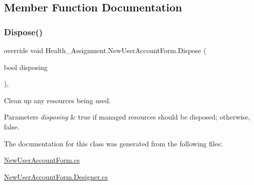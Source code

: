 \subsection{Member Function Documentation}
\mbox{\label{class_health___assignment_1_1_new_user_account_form_a0e75f26c896eb8b06255a75fb8007bb5}} 
\subsubsection{\texorpdfstring{Dispose()}{Dispose()}}
{\footnotesize\ttfamily override void Health\+\_\+\+Assignment.\+New\+User\+Account\+Form.\+Dispose (\begin{DoxyParamCaption}\item[{bool}]{disposing }\end{DoxyParamCaption})\hspace{0.3cm}{\ttfamily [inline]}, {\ttfamily [protected]}}



Clean up any resources being used. 


\begin{DoxyParams}{Parameters}
{\em disposing} & true if managed resources should be disposed; otherwise, false.\\
\hline
\end{DoxyParams}


The documentation for this class was generated from the following files\+:\begin{DoxyCompactItemize}
\item 
\hyperlink{_new_user_account_form_8cs}{New\+User\+Account\+Form.\+cs}\item 
\hyperlink{_new_user_account_form_8_designer_8cs}{New\+User\+Account\+Form.\+Designer.\+cs}\end{DoxyCompactItemize}
